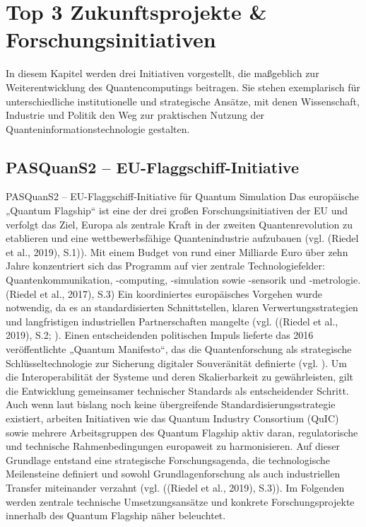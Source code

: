 \section{Top 3 Zukunftsprojekte \& Forschungsinitiativen}
\label{Chemie_Projekte}

In diesem Kapitel werden drei Initiativen vorgestellt, die maßgeblich zur Weiterentwicklung des Quantencomputings beitragen. Sie stehen exemplarisch für unterschiedliche institutionelle und strategische Ansätze, mit denen Wissenschaft, Industrie und Politik den Weg zur praktischen Nutzung der Quanteninformationstechnologie gestalten. 

\subsection*{PASQuanS2 – EU-Flaggschiff-Initiative}
\label{Chemie_Projekte_PASQuanS2}

PASQuanS2 – EU-Flaggschiff-Initiative für Quantum Simulation
Das europäische „Quantum Flagship“ ist eine der drei großen Forschungsinitiativen der EU und verfolgt das Ziel, Europa als zentrale Kraft in der zweiten Quantenrevolution zu etablieren und eine wettbewerbsfähige Quantenindustrie aufzubauen (vgl. \cite{}(Riedel et al., 2019), S.1)). Mit einem Budget von rund einer Milliarde Euro über zehn Jahre konzentriert sich das Programm auf vier zentrale Technologiefelder: Quantenkommunikation, -computing, -simulation sowie -sensorik und -metrologie. \cite{}(Riedel et al., 2017), S.3)
Ein koordiniertes europäisches Vorgehen wurde notwendig, da es an standardisierten Schnittstellen, klaren Verwertungsstrategien und langfristigen industriellen Partnerschaften mangelte (vgl. \cite{}((Riedel et al., 2019), S.2; \cite{rasanenPathEuropeanQuantum2021}). Einen entscheidenden politischen Impuls lieferte das 2016 veröffentlichte „Quantum Manifesto“, das die Quantenforschung als strategische Schlüsseltechnologie zur Sicherung digitaler Souveränität definierte (vgl. \cite{vandeventerEuropeanStandardsQuantum2022}). Um die Interoperabilität der Systeme und deren Skalierbarkeit zu gewährleisten, gilt die Entwicklung gemeinsamer technischer Standards als entscheidender Schritt. Auch wenn laut \cite{vandeventerEuropeanStandardsQuantum2022} bislang noch keine übergreifende Standardisierungsstrategie existiert, arbeiten Initiativen wie das Quantum Industry Consortium (QuIC) sowie mehrere Arbeitsgruppen des Quantum Flagship aktiv daran, regulatorische und technische Rahmenbedingungen europaweit zu harmonisieren. Auf dieser Grundlage entstand eine strategische Forschungsagenda, die technologische Meilensteine definiert und sowohl Grundlagenforschung als auch industriellen Transfer miteinander verzahnt (vgl. \cite{}((Riedel et al., 2019), S.3)). Im Folgenden werden zentrale technische Umsetzungsansätze und konkrete Forschungsprojekte innerhalb des Quantum Flagship näher beleuchtet.

